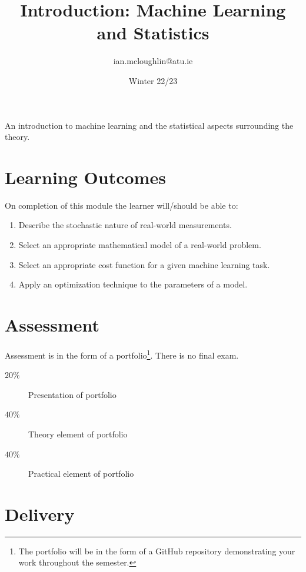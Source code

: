 \documentclass[a4paper]{tufte-handout}
\title{Introduction: Machine Learning and Statistics}
\author{ian.mcloughlin@atu.ie}
\date{Winter 22/23}
\begin{document}
\maketitle

An introduction to machine learning and the statistical aspects surrounding the theory.


\section{Learning Outcomes}

On completion of this module the learner will/should be able to:

\begin{enumerate}
\item Describe the stochastic nature of real-world measurements.
\item Select an appropriate mathematical model of a real-world problem.
\item Select an appropriate cost function for a given machine learning task.
\item Apply an optimization technique to the parameters of a model.
\end{enumerate}


\section{Assessment}

Assessment is in the form of a portfolio\footnote{The portfolio will be in the form of a GitHub repository demonstrating your work throughout the semester.}. There is no final exam.

\begin{description}
  \item[$20\%$] Presentation of portfolio
  \item[$40\%$] Theory element of portfolio
  \item[$40\%$]	Practical element of portfolio
\end{description}

 
\section{Delivery}
\end{document}
